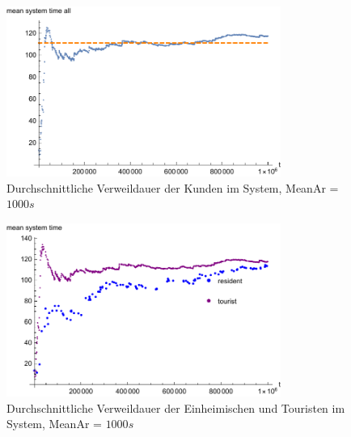\begin{figure}[htpb]
	\centering
	\includegraphics[width=0.8\textwidth]{abbildungen/1_Phone_VIP/Arrival_1000_Serve_100_dur_1000000_Skip_0/MeanSystemTimeAll.pdf}
	\caption{Durchschnittliche Verweildauer der Kunden im System, MeanAr = $1000s$}
	\label{fig:MSTVIP1000ALL}
\end{figure}

\begin{figure}[htpb]
	\centering
	\includegraphics[width=0.8\textwidth]{abbildungen/1_Phone_VIP/Arrival_1000_Serve_100_dur_1000000_Skip_0/MeanSystemTimeTouristAndResident.pdf}
	\caption{Durchschnittliche Verweildauer der Einheimischen und Touristen im System, MeanAr = $1000s$}
	\label{fig:MSTVIP1000VGL}
\end{figure}

